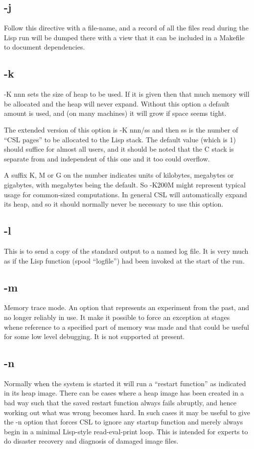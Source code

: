 \documentclass[a4paper,11pt]{article}
\begin{document}
\subsection{\ttfamily -j}
Follow this directive with a file-name, and a record of all the files read
during the Lisp run will be dumped there with a view that it can be included
in a Makefile to document dependencies.

\subsection{\ttfamily -k}
{\ttfamily -K nnn} sets the size of heap to be used.  If it is given then that much
memory will be allocated and the heap will never expand.  Without this
option a default amount is used, and (on many machines) it will grow
if space seems tight.
  
The extended version of this option is {\ttfamily -K nnn/ss} and then ss is the
number of ``CSL pages'' to be allocated to the Lisp stack. The default
value (which is 1) should suffice for almost all users, and it should
be noted that the C stack is separate from and independent of this one and
it too could overflow.
  
A suffix K, M or G on the number indicates units of kilobytes, megabytes or
gigabytes, with megabytes being the default. So {\ttfamily -K200M} might
represent typical usage for common-sized computations. In general CSL
will automatically expand its heap, and so it should normally never be
necessary to use this option.

\subsection{\ttfamily -l}
This is to send a copy of the standard output to a named log file. It is
very much as if the Lisp function {\ttfamily (spool ``logfile'')} had been
invoked at the start of the run.

\subsection{\ttfamily -m}
Memory trace mode. An option that represents an experiment from the past,
and no longer reliably in use. It make it possible to force an
exception at stages whene reference to a specified part of memory was made
and that could be useful for some low level debugging. It is not supported
at present.

\subsection{\ttfamily -n}
Normally when the system is started it will run a ``restart function'' as
indicated in its heap image. There can be cases where a heap image has been
created in a bad way such that the saved restart function always fails
abruptly, and hence working out what was wrong becomes hard. In such cases
it may be useful to give the {\ttfamily -n} option that forces CSL to
ignore any startup function and merely always begin in a minimal Lisp-style
read-eval-print loop. This is intended for experts to do disaster recovery
and diagnosis of damaged image files.
\end{document}
